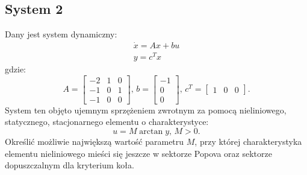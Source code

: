 \documentclass{article}
\begin{document}

    \subsection{System 2}
    Dany jest system dynamiczny:
    \begin{equation}
        \begin{array}{l}
            \dot{x} = Ax + bu\\
            y = c^{T}x 
        \end{array}
    \end{equation}
    gdzie:
    \begin{equation}
        A
        =
        \left[
        \begin{array}{rrr}
            -2 & 1 & 0\\
            -1 & 0 & 1\\
            -1 & 0 & 0
        \end{array}
        \right],\,
        b
        =
        \left[
        \begin{array}{r}
            -1\\
            0\\
            0
        \end{array}
        \right],\,
        c^{T}
        =
        \left[
        \begin{array}{ccc}
            1 & 0 & 0
        \end{array}
        \right].
    \end{equation}
    System ten objęto ujemnym sprzężeniem zwrotnym za pomocą nieliniowego, statycznego, stacjonarnego elementu o charakterystyce:
    \begin{equation}
        u = M \arctan{y},\,M>0.
    \end{equation}
    Określić możliwie największą wartość parametru $M$, przy której charakterystyka elementu nieliniowego mieści się jeszcze w sektorze Popova oraz sektorze dopuszczalnym dla kryterium koła.

\end{document}
